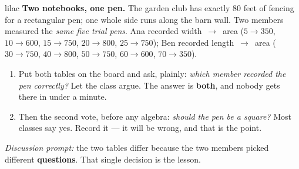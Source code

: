 \documentclass[10pt]{article}
\begin{document}
\begin{skillbox}[Hook]{lilac}
    \textbf{Two notebooks, one pen.} The garden club has exactly 80 feet of
    fencing for a rectangular pen; one whole side runs along the barn wall. Two
    members measured the \textit{same five trial pens}. Ana recorded
    width~$\to$~area ($5 \to 350$, $10 \to 600$, $15 \to 750$, $20 \to 800$,
    $25 \to 750$); Ben recorded length~$\to$~area ($30 \to 750$, $40 \to 800$,
    $50 \to 750$, $60 \to 600$, $70 \to 350$).
    \begin{enumerate}[itemsep=2pt]
        \item Put both tables on the board and ask, plainly: \textit{which
              member recorded the pen correctly?} Let the class argue. The
              answer is \textbf{both}, and nobody gets there in under a minute.
        \item Then the second vote, before any algebra: \textit{should the pen
              be a square?} Most classes say yes. Record it --- it will be
              wrong, and that is the point.
    \end{enumerate}
    \textit{Discussion prompt:} the two tables differ because the two members
    picked different \textbf{questions}. That single decision is the lesson.
\end{skillbox}
\end{document}
